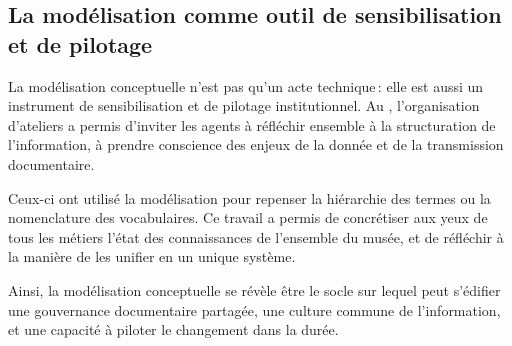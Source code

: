 

\subsection{La modélisation comme outil de sensibilisation et de pilotage}


La modélisation conceptuelle n’est pas qu’un acte technique : elle est aussi un instrument de sensibilisation et de pilotage institutionnel. Au \mae, l’organisation d’ateliers a permis d’inviter les agents à réfléchir ensemble à la structuration de l’information, à prendre conscience des enjeux de la donnée et de la transmission documentaire.

Ceux-ci ont utilisé la modélisation pour repenser la hiérarchie des termes ou la nomenclature des vocabulaires. Ce travail a permis de concrétiser aux yeux de tous les métiers l'état des connaissances de l'ensemble du musée, et de réfléchir à la manière de les unifier en un unique système.

\bigskip
\bigskip
\bigskip

Ainsi, la modélisation conceptuelle se révèle être le socle sur lequel peut s’édifier une gouvernance documentaire partagée, une culture commune de l’information, et une capacité à piloter le changement dans la durée.